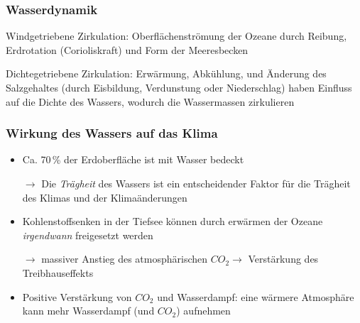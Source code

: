 \begin{frame}
	\frametitle{Wasserdynamik} %
	\begin{block}{Windgetriebene Zirkulation: } %
		Oberflächenströmung der Ozeane durch Reibung, Erdrotation (Corioliskraft) und Form der Meeresbecken 
	\end{block}
	\begin{block}{Dichtegetriebene Zirkulation: }  %
		Erwärmung, Abkühlung, und Änderung des Salzgehaltes (durch Eisbildung, Verdunstung oder Niederschlag) haben Einfluss auf die Dichte des Wassers, wodurch die Wassermassen zirkulieren
	\end{block}


\end{frame}


\begin{frame}
	\frametitle{Wirkung des Wassers auf das Klima}
	\begin{itemize}
	\item Ca. 70\,\% der Erdoberfläche ist mit Wasser bedeckt
	\item [$\rightarrow$] Die \textit{Trägheit} des Wassers ist ein entscheidender Faktor für die Trägheit des Klimas und der Klimaänderungen %
	\item Kohlenstoffsenken in der Tiefsee können durch erwärmen der Ozeane \textit{irgendwann} freigesetzt werden
	\item[$\rightarrow$] massiver Anstieg des atmosphärischen $CO_2 \rightarrow$ Verstärkung des Treibhauseffekts
	\item Positive Verstärkung von $CO_2$ und Wasserdampf: eine wärmere Atmosphäre kann mehr Wasserdampf (und $CO_2$) aufnehmen
	\end{itemize}
\end{frame}

